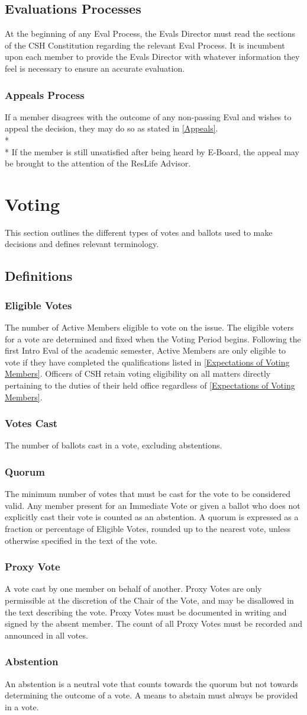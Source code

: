 \documentclass{article}
\newcommand{\article}[1]{\section{#1} \label{#1}}
\newcommand{\asection}[1]{\subsection{#1} \label{#1}}
\newcommand{\asubsection}[1]{\subsubsection{#1} \label{#1}}
\begin{document}
\asection{Evaluations Processes}
At the beginning of any Eval Process, the Evals Director must read the sections of the CSH Constitution regarding the relevant Eval Process.
It is incumbent upon each member to provide the Evals Director with whatever information they feel is necessary to ensure an accurate evaluation.

\asubsection{Appeals Process}
If a member disagrees with the outcome of any non-passing Eval and wishes to appeal the decision, they may do so as stated in \ref{Appeals}.
\\* \\*
If the member is still unsatisfied after being heard by E-Board, the appeal may be brought to the attention of the ResLife Advisor.

\article{Voting}
This section outlines the different types of votes and ballots used to make decisions and defines relevant terminology.

\asection{Definitions}

\asubsection{Eligible Votes}
The number of Active Members eligible to vote on the issue.
The eligible voters for a vote are determined and fixed when the Voting Period begins.
Following the first Intro Eval of the academic semester, Active Members are only eligible to vote if they have completed the qualifications listed in \ref{Expectations of Voting Members}.
Officers of CSH retain voting eligibility on all matters directly pertaining to the duties of their held office regardless of \ref{Expectations of Voting Members}.

\asubsection{Votes Cast}
The number of ballots cast in a vote, excluding abstentions.

\asubsection{Quorum}
The minimum number of votes that must be cast for the vote to be considered valid.
Any member present for an Immediate Vote or given a ballot who does not explicitly cast their vote is counted as an abstention.
A quorum is expressed as a fraction or percentage of Eligible Votes, rounded up to the nearest vote, unless otherwise specified in the text of the vote.

\asubsection{Proxy Vote}
A vote cast by one member on behalf of another.
Proxy Votes are only permissible at the discretion of the Chair of the Vote, and may be disallowed in the text describing the vote.
Proxy Votes must be documented in writing and signed by the absent member.
The count of all Proxy Votes must be recorded and announced in all votes.

\asubsection{Abstention}
An abstention is a neutral vote that counts towards the quorum but not towards determining the outcome of a vote.
A means to abstain must always be provided in a vote.
\end{document}
